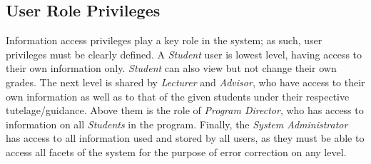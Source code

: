 \documentclass[11pt]{article}
\begin{document}
\subsection*{User Role Privileges}
Information access privileges play a key role in the system; as such, user privileges must be clearly defined. A \emph{Student} user is lowest level, having access to their own information only. \emph{Student} can also view but not change their own grades. The next level is shared by \emph{Lecturer} and \emph{Advisor}, who have access to their own information as well as to that of the given students under their respective tutelage/guidance. Above them is the role of \emph{Program Director}, who has access to information on all \emph{Students} in the program. Finally, the \emph{System Administrator} has access to all information used and stored by all users, as they must be able to access all facets of the system for the purpose of error correction on any level.
\newpage
\end{document}
